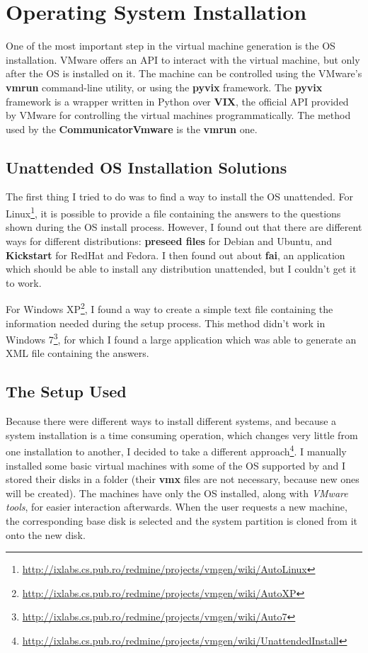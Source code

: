 \section{Operating System Installation}
\label{sec:vmware-os}
One of the most important step in the virtual machine generation is the OS
installation. VMware offers an API to interact with the virtual machine, but
only after the OS is installed on it.  The machine can be controlled using the
VMware's \textbf{vmrun} command-line utility, or using the \textbf{pyvix}
framework. The \textbf{pyvix} framework is a wrapper written in Python over
\textbf{VIX}, the official API provided by VMware for controlling the virtual
machines programmatically. The method used by the \textbf{CommunicatorVmware} is
the \textbf{vmrun} one.

\subsection{Unattended OS Installation Solutions}
\label{sub-sec:vmware-unattended-solutions}
The first thing I tried to do was to find a way to install the OS unattended.
For Linux\footnote{\url{http://ixlabs.cs.pub.ro/redmine/projects/vmgen/wiki/AutoLinux}},
it is possible to provide a file containing the answers to the questions shown
during the OS install process. However, I found out that there are different
ways for different distributions: \textbf{preseed files} for Debian and Ubuntu,
and \textbf{Kickstart} for RedHat and Fedora. I then found out about
\textbf{fai}, an application which should be able to install any
distribution unattended, but I couldn't get it to work.

For Windows XP\footnote{\url{http://ixlabs.cs.pub.ro/redmine/projects/vmgen/wiki/AutoXP}},
I found a way to create a simple text file containing the information needed
during the setup process. This method didn't work in Windows 7\footnote{\url{http://ixlabs.cs.pub.ro/redmine/projects/vmgen/wiki/Auto7}}, for which I
found a large application which was able to generate an XML file containing the
answers.

\subsection{The Setup Used}
\label{sub-sec:vmware-setup}
Because there were different ways to install different systems, and because a
system installation is a time consuming operation, which changes very little
from one installation to another, I decided to take a different
approach\footnote{\url{http://ixlabs.cs.pub.ro/redmine/projects/vmgen/wiki/UnattendedInstall}}.
I manually installed some basic virtual machines with some of the OS supported
by \project and I stored their disks in a folder (their \textbf{vmx} files are
not necessary, because new ones will be created). The machines have only the OS
installed, along with \textit{VMware tools}, for easier interaction afterwards.
When the user requests a new machine, the corresponding base disk is selected
and the system partition is cloned from it onto the new disk.


